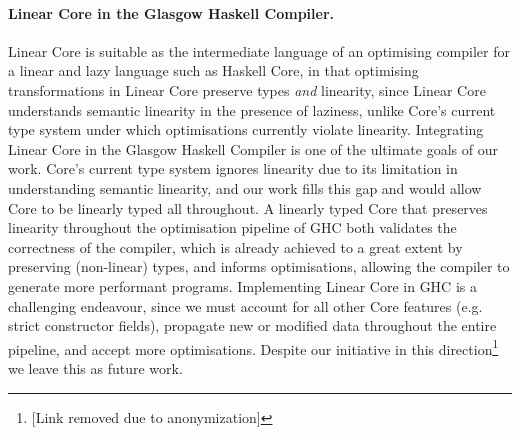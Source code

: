 \documentclass[acmsmall,review,anonymous,screen]{acmart}
\begin{document}

\paragraph{Linear Core in the Glasgow Haskell Compiler.}
Linear Core is suitable as the intermediate language of an optimising compiler
for a linear and lazy language such as Haskell Core, in that optimising
transformations in Linear Core preserve types \emph{and} linearity, since Linear
Core understands semantic linearity in the presence of laziness, unlike
Core's current type system under which optimisations currently violate
linearity.
%
Integrating Linear Core in the Glasgow Haskell Compiler is one of the ultimate
goals of our work. Core's current type system ignores linearity due to
its limitation in understanding semantic linearity, and our work fills this gap
and would allow Core to be linearly typed all throughout.
%
A linearly typed Core that preserves linearity throughout the optimisation
pipeline of GHC both validates the correctness of the compiler, which is
already achieved to a great extent by preserving (non-linear) types, and
informs optimisations, allowing the compiler to generate more performant programs.
%
Implementing Linear Core in GHC is a challenging endeavour, since we must
account for all other Core features (e.g. strict constructor fields), propagate
new or modified data throughout the entire pipeline, and accept more
optimisations. Despite our initiative in this direction\footnote{[Link removed
due to
anonymization]} %
we leave this as future work.
\end{document}
